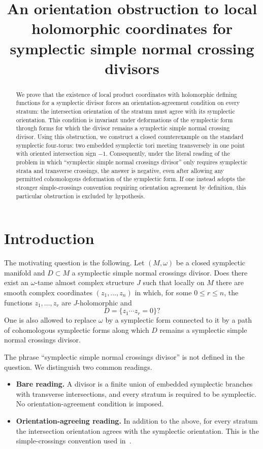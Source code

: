 \documentclass[12pt]{article}
\title{An orientation obstruction to local holomorphic coordinates for symplectic simple normal crossing divisors}
\author{}
\date{}
\begin{document}
\maketitle

\begin{abstract}
We prove that the existence of local product coordinates with holomorphic defining functions for a symplectic divisor forces an orientation-agreement condition on every stratum: the intersection orientation of the stratum must agree with its symplectic orientation. This condition is invariant under deformations of the symplectic form through forms for which the divisor remains a symplectic simple normal crossing divisor. Using this obstruction, we construct a closed counterexample on the standard symplectic four-torus: two embedded symplectic tori meeting transversely in one point with oriented intersection sign \(-1\). Consequently, under the literal reading of the problem in which ``symplectic simple normal crossings divisor'' only requires symplectic strata and transverse crossings, the answer is negative, even after allowing any permitted cohomologous deformation of the symplectic form. If one instead adopts the stronger simple-crossings convention requiring orientation agreement by definition, this particular obstruction is excluded by hypothesis.
\end{abstract}

\section{Introduction}

The motivating question is the following. Let \((M,\omega)\) be a closed symplectic manifold and \(D\subset M\) a symplectic simple normal crossings divisor. Does there exist an \(\omega\)-tame almost complex structure \(J\) such that locally on \(M\) there are smooth complex coordinates \((z_1,\dots,z_n)\) in which, for some \(0\le r\le n\), the functions \(z_1,\dots,z_r\) are \(J\)-holomorphic and
\[
D=\{z_1\cdots z_r=0\}?
\]
One is also allowed to replace \(\omega\) by a symplectic form connected to it by a path of cohomologous symplectic forms along which \(D\) remains a symplectic simple normal crossings divisor.

The phrase ``symplectic simple normal crossings divisor'' is not defined in the question. We distinguish two common readings.

\begin{itemize}
\item \textbf{Bare reading.} A divisor is a finite union of embedded symplectic branches with transverse intersections, and every stratum is required to be symplectic. No orientation-agreement condition is imposed.
\item \textbf{Orientation-agreeing reading.} In addition to the above, for every stratum the intersection orientation agrees with the symplectic orientation. This is the simple-crossings convention used in~\cite{FMZ}.
\end{itemize}
\end{document}
